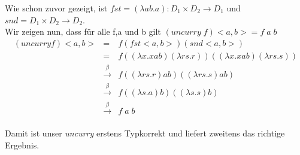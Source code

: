 \documentclass[11pt,a4paper,ngerman]{article}
\begin{document}
\begin{enumerate}[(a)]
      Wie schon zuvor gezeigt, ist $fst = (\lambda ab.a) : D_1 \times D_2 \rightarrow D_1$ und
      $snd = D_1 \times D_2 \rightarrow D_2$.\\

      Wir zeigen nun, dass für alle f,a und b gilt $(uncurry \; f) <a,b> = f \;a \; b$\\
      $$\begin{array}{rcl}
      (uncurry f) <a,b> &=& f (fst <a,b>) (snd <a,b>)\\
         &=& f ( (\lambda x.x ab)(\lambda rs.r)) ( (\lambda x.x ab)(\lambda rs.s))\\
         &\overset{\beta}{\rightarrow}&
            f ((\lambda rs.r) ab) ((\lambda rs.s) ab)\\
         &\overset{\beta}{\rightarrow}&
            f ((\lambda s.a) b) ((\lambda s.s) b)\\
         &\overset{\beta}{\rightarrow}&
            f \; a \;  b\\
      \end{array}$$
      
      Damit ist unser \emph{uncurry} erstens Typkorrekt und liefert zweitens das richtige Ergebnis.
\end{enumerate}

\label{LastPage}
\end{document}
